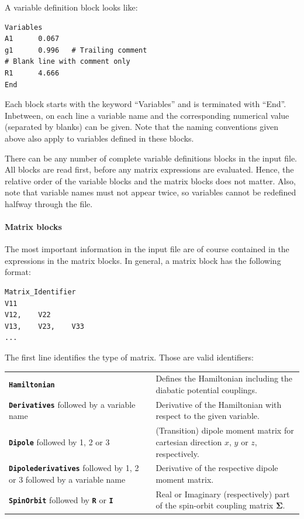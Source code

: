 \documentclass[a4paper,11pt,DIV=15,openany,twoside=false]{scrbook}
\newcommand{\ttt}[1]{\textbf{\texttt{#1}}}
\newenvironment{example}{
  \vspace{0mm}
  \definecolor{shadecolor}{HTML}{E4F4FF}
  \begin{shaded}
}{
  \end{shaded}
}
\begin{document}
A variable definition block looks like:
\begin{example}
  \begin{verbatim}
Variables
A1      0.067
g1      0.996   # Trailing comment
# Blank line with comment only
R1      4.666
End
  \end{verbatim}
\end{example}
Each block starts with the keyword ``Variables'' and is terminated with ``End''. Inbetween, on each line a variable name and the corresponding numerical value (separated by blanks) can be given. Note that the naming conventions given above also apply to variables defined in these blocks. 

There can be any number of complete variable definitions blocks in the input file. All blocks are read first, before any matrix expressions are evaluated. Hence, the relative order of the variable blocks and the matrix blocks does not matter. Also, note that variable names must not appear twice, so variables cannot be redefined halfway through the file.

\paragraph{Matrix blocks}

The most important information in the input file are of course contained in the expressions in the matrix blocks. In general, a matrix block has the following format:
\begin{example}
  \begin{verbatim}
Matrix_Identifier
V11
V12,    V22
V13,    V23,    V33
...
  \end{verbatim}
\end{example}
The first line identifies the type of matrix. Those are valid identifiers:

\begin{tabular}{p{5cm}p{9cm}}
\ttt{Hamiltonian}                               &Defines the Hamiltonian including the diabatic potential couplings.\\
\ttt{Derivatives} followed by a variable name   &Derivative of the Hamiltonian with respect to the given variable.\\
\ttt{Dipole} followed by 1, 2 or 3              &(Transition) dipole moment matrix for cartesian direction $x$, $y$ or $z$, respectively.\\
\ttt{Dipolederivatives} followed by 1, 2 or 3 followed by a variable name       &Derivative of the respective dipole moment matrix.\\
\ttt{SpinOrbit} followed by \ttt{R} or \ttt{I}  &Real or Imaginary (respectively) part of the spin-orbit coupling matrix $\boldsymbol{\Sigma}$.\\
\end{tabular}
\end{document}

